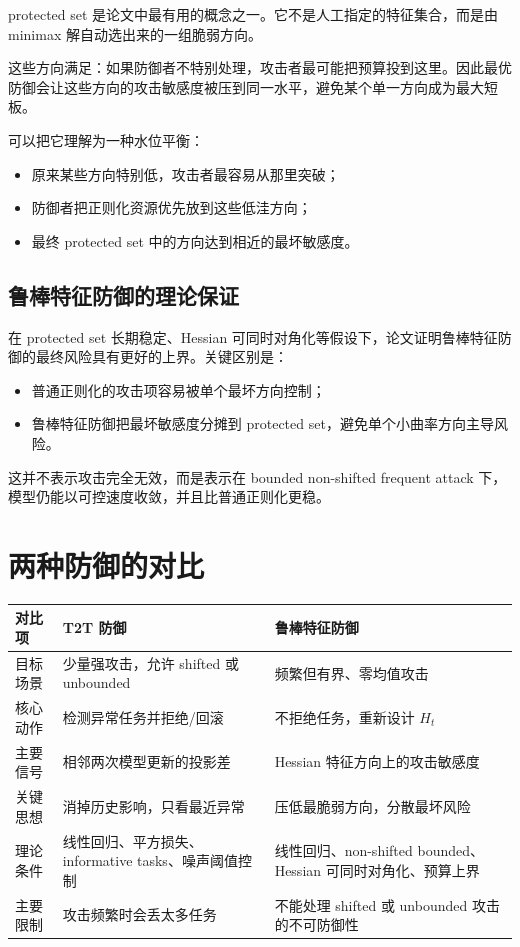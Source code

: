 \documentclass[UTF8,fontset=none,11pt]{ctexart}
\begin{document}
protected set 是论文中最有用的概念之一。它不是人工指定的特征集合，而是由 minimax 解自动选出来的一组脆弱方向。

这些方向满足：如果防御者不特别处理，攻击者最可能把预算投到这里。因此最优防御会让这些方向的攻击敏感度被压到同一水平，避免某个单一方向成为最大短板。

可以把它理解为一种水位平衡：
\begin{itemize}
  \item 原来某些方向特别低，攻击者最容易从那里突破；
  \item 防御者把正则化资源优先放到这些低洼方向；
  \item 最终 protected set 中的方向达到相近的最坏敏感度。
\end{itemize}

\subsection{鲁棒特征防御的理论保证}

在 protected set 长期稳定、Hessian 可同时对角化等假设下，论文证明鲁棒特征防御的最终风险具有更好的上界。关键区别是：
\begin{itemize}
  \item 普通正则化的攻击项容易被单个最坏方向控制；
  \item 鲁棒特征防御把最坏敏感度分摊到 protected set，避免单个小曲率方向主导风险。
\end{itemize}

这并不表示攻击完全无效，而是表示在 bounded non-shifted frequent attack 下，模型仍能以可控速度收敛，并且比普通正则化更稳。

\section{两种防御的对比}

\begin{center}
\begin{tabular}{p{3.2cm}p{5.2cm}p{5.2cm}}
\toprule
对比项 & T2T 防御 & 鲁棒特征防御 \\
\midrule
目标场景
& 少量强攻击，允许 shifted 或 unbounded
& 频繁但有界、零均值攻击 \\
\addlinespace
核心动作
& 检测异常任务并拒绝/回滚
& 不拒绝任务，重新设计 \(H_t\) \\
\addlinespace
主要信号
& 相邻两次模型更新的投影差
& Hessian 特征方向上的攻击敏感度 \\
\addlinespace
关键思想
& 消掉历史影响，只看最近异常
& 压低最脆弱方向，分散最坏风险 \\
\addlinespace
理论条件
& 线性回归、平方损失、informative tasks、噪声阈值控制
& 线性回归、non-shifted bounded、Hessian 可同时对角化、预算上界 \\
\addlinespace
主要限制
& 攻击频繁时会丢太多任务
& 不能处理 shifted 或 unbounded 攻击的不可防御性 \\
\bottomrule
\end{tabular}
\end{center}
\end{document}
